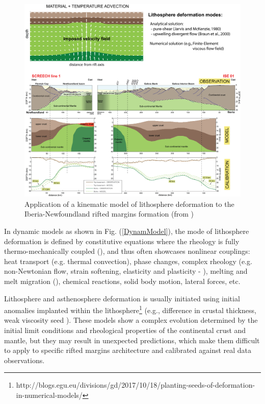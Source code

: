 \documentclass[a4paper]{article}
\begin{document}
\begin{figure}[h!]
\centering
\includegraphics[scale=0.5]{images/Lfig3.jpg}
\caption{Application of a kinematic model of lithosphere deformation to the Iberia-Newfoundland rifted margins formation (from \cite{jekm16})}
\label{KinemModel}
\end{figure}

In dynamic models as shown in Fig. (\ref{DynamModel}), the mode of lithosphere deformation is defined by constitutive equations where the rheology is fully thermo-mechanically coupled (\cite{thie11}), and thus often showcases
nonlinear couplings: heat transport (e.g. thermal convection), phase changes, complex rheology (e.g. non-Newtonian flow, strain softening, elasticity and plasticity - \cite{hube03,hubb05,hube07}), melting and melt migration (\cite{arhm09, latb17}), chemical reactions, solid body motion, lateral forces, etc. 

Lithosphere and asthenosphere deformation is usually initiated using initial anomalies implanted within the lithosphere\footnote{http://blogs.egu.eu/divisions/gd/2017/10/18/planting-seeds-of-deformation-in-numerical-models/} (e.g., difference in crustal thickness, weak viscosity seed \cite{wijk05,dyrm07}). These models show a complex evolution determined by the initial limit conditions and rheological properties of the continental crust and mantle, but they may result in unexpected predictions, which make them difficult to apply to specific rifted margins architecture and calibrated against real data observations.
\end{document}
